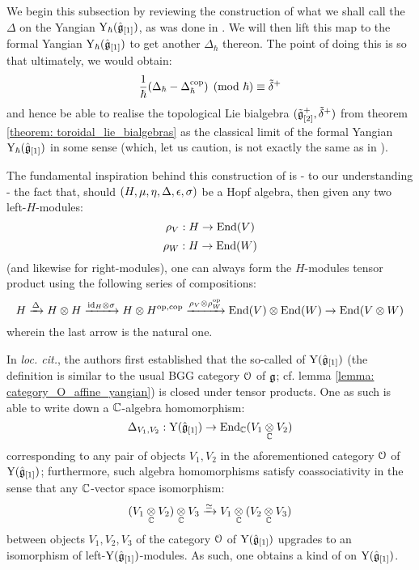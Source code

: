         We begin this subsection by reviewing the construction of what we shall call the  $\Delta$ on the Yangian $\mathrm{Y}_{\hbar}(\hat{\mathfrak{g}}_{[1]})$, as was done in \cite[Sections 4 and 5]{guay_nakajima_wendlandt_affine_yangian_coproduct}. We will then lift this map to the formal Yangian $\mathrm{Y}_{\hbar}(\hat{\mathfrak{g}}_{[1]})$ to get another  $\Delta_{\hbar}$ thereon. The point of doing this is so that ultimately, we would obtain:
            $$\frac{1}{\hbar}(\Delta_{\hbar} - \Delta_{\hbar}^{\mathrm{cop}}) \pmod{\hbar} \equiv \tilde{\delta}^+$$
        and hence be able to realise the topological Lie bialgebra $(\tilde{\mathfrak{g}}_{[2]}^+, \tilde{\delta}^+)$ from theorem \ref{theorem: toroidal_lie_bialgebras} as the classical limit of the formal Yangian $\mathrm{Y}_{\hbar}(\hat{\mathfrak{g}}_{[1]})$ in some sense (which, let us caution, is not exactly the same as in \cite{etingof_kazhdan_quantisation_1}).
        
        The fundamental inspiration behind this construction of \cite{guay_nakajima_wendlandt_affine_yangian_coproduct} is - to our understanding - the fact that, should $(H, \mu, \eta, \Delta, \epsilon, \sigma)$ be a Hopf algebra, then given any two left-$H$-modules:
            $$\rho_V: H \to \mathrm{End}(V)$$
            $$\rho_W: H \to \mathrm{End}(W)$$
        (and likewise for right-modules), one can always form the $H$-modules tensor product using the following series of compositions:
            $$H \xrightarrow[]{\Delta} H \tensor H \xrightarrow[]{\id_H \tensor \sigma} H \tensor H^{\op, \cop} \xrightarrow[]{\rho_V \tensor \rho_W^{\op}} \End(V) \tensor \End(W) \to \End(V \tensor W)$$
        wherein the last arrow is the natural one.
        
        In \textit{loc. cit.}, the authors first established that the so-called  of $\mathrm{Y}(\hat{\mathfrak{g}}_{[1]})$ (the definition is similar to the usual BGG category $\mathcal{O}$ of $\mathfrak{g}$; cf. lemma \ref{lemma: category_O_affine_yangian}) is closed under tensor products. One as such is able to write down a $\mathbb{C}$-algebra homomorphism:
            $$\Delta_{V_1, V_2}: \rmY(\hat{\g}_{[1]}) \to \End_{\bbC}(V_1 \tensor_{\bbC} V_2)$$
        corresponding to any pair of objects $V_1, V_2$ in the aforementioned category $\mathcal{O}$ of $\mathrm{Y}(\hat{\mathfrak{g}}_{[1]})$; furthermore, such algebra homomorphisms satisfy coassociativity in the sense that any $\mathbb{C}$-vector space isomorphism:
            $$(V_1 \tensor_{\bbC} V_2) \tensor_{\bbC} V_3 \xrightarrow[]{\cong} V_1 \tensor_{\bbC} (V_2 \tensor_{\bbC} V_3)$$
        between objects $V_1, V_2, V_3$ of the category $\mathcal{O}$ of $\mathrm{Y}(\hat{\mathfrak{g}}_{[1]})$ upgrades to an isomorphism of left-$\mathrm{Y}(\hat{\mathfrak{g}}_{[1]})$-modules. As such, one obtains a kind of  on $\mathrm{Y}(\hat{\mathfrak{g}}_{[1]})$. 

